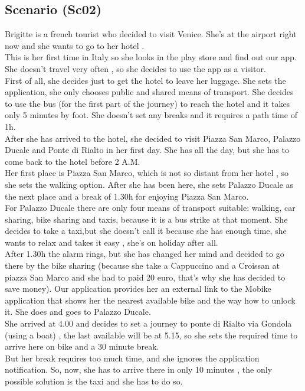 \documentclass[a4paper,leqno]{book}
\begin{document}
\subsection{Scenario (Sc02) }
Brigitte is a french tourist who decided to visit Venice. She's at the airport right now and she wants to go to her hotel .\\
This is her first time in Italy so she looks in the play store and find out our app.
She doesn't travel very often , so she decides to use the app as a visitor.\\
First of all, she decides just to get the hotel to leave her luggage.
She sets the application, she only chooses public and shared means of transport. 
She decides to use the bus (for the first part of the journey) to reach the hotel and  it takes only 5 minutes by foot. 
She doesn't set any breaks and it requires a path time of 1h.\\
After she has arrived to the hotel, she decided to visit Piazza San Marco, Palazzo Ducale and Ponte di Rialto in her first day.
She has all the day, but she has to come back to the hotel before 2 A.M.\\
Her first place is Piazza San Marco, which is not so distant from her hotel , so she sets the walking option. 
After she has been here, she sets Palazzo Ducale as the next place and a break of 1.30h for enjoying Piazza San Marco.\\
For Palazzo Ducale there are only four means of transport suitable: walking, car sharing, bike sharing and taxis, because it is a bus strike at that moment. 
She decides to take a taxi,but she doesn't call it because she has enough time,  she wants to relax and takes it easy , she's on holiday after all.\\
After 1.30h the alarm rings, but she has changed her mind  and decided to go there by the bike sharing (because she take a Cappuccino and a Croissan at piazza San Marco and she had to paid 20 euro, that's why she has decided to save money). 
Our application provides her an external link to the Mobike application that shows her the nearest available bike and the way how to unlock it.
She does and goes to Palazzo Ducale.\\
She arrived at 4.00 and decides to set a journey to ponte di Rialto via Gondola (using a boat) , the last available will be at 5.15, so she sets the required time to arrive here on bike and a 30 minute break.\\
But her break requires too much time, and she ignores the application notification.
So, now, she has to arrive there in only 10 minutes , the only possible solution is the taxi and she has to do so.\\
\end{document}
